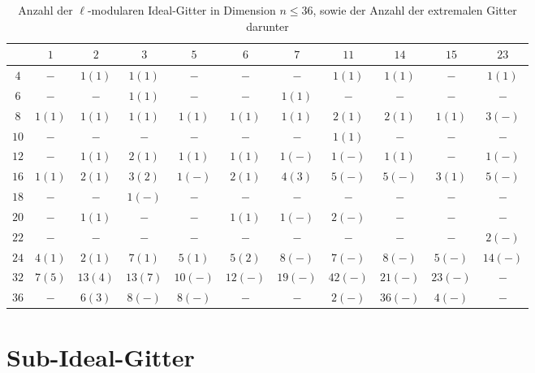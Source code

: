 \documentclass[12pt,a4paper,halfparskip,headsepline,bibtotocnumbered]{scrreprt}
\theoremstyle{nummermitklammern}
\theoremstyle{nonumberbreak}
\begin{document}
\begin{table}\label{tab:numidlat}
	\centering
	\begin{tabular}{|c||c|c|c|c|c|c|c|c|c|c|}
		\hline
		\backslashbox{$n$}{$\ell$}	&$1$	&$2$	&$3$	&$5$	&$6$	&$7$	&$11$	&$14$	&$15$	&$23$\\ \hline \hline
		$4$		&$-$		&$1(1)$		&$1(1)$		&$-$		&$-$		&$-$		&$1(1)$		&$1(1)$		&$-$		&$1(1)$ \\ \hline
		$6$		&$-$		&$-$		&$1(1)$		&$-$		&$-$		&$1(1)$		&$-$		&$-$		&$-$		&$-$ \\ \hline
		$8$		&$1(1)$		&$1(1)$		&$1(1)$		&$1(1)$		&$1(1)$		&$1(1)$		&$2(1)$		&$2(1)$		&$1(1)$		&$3(-)$ \\ \hline
		$10$	&$-$		&$-$		&$-$		&$-$		&$-$		&$-$		&$1(1)$		&$-$		&$-$		&$-$ \\ \hline
		$12$	&$-$		&$1(1)$		&$2(1)$		&$1(1)$		&$1(1)$		&$1(-)$		&$1(-)$		&$1(1)$		&$-$		&$1(-)$ \\ \hline
		$16$	&$1(1)$		&$2(1)$		&$3(2)$		&$1(-)$		&$2(1)$		&$4(3)$		&$5(-)$		&$5(-)$		&$3(1)$		&$5(-)$ \\ \hline
		$18$	&$-$		&$-$		&$1(-)$		&$-$		&$-$		&$-$		&$-$		&$-$		&$-$		&$-$ \\ \hline
		$20$	&$-$		&$1(1)$		&$-$		&$-$		&$1(1)$		&$1(-)$		&$2(-)$		&$-$		&$-$		&$-$ \\ \hline
		$22$	&$-$		&$-$		&$-$		&$-$		&$-$		&$-$		&$-$		&$-$		&$-$		&$2(-)$ \\ \hline
		$24$	&$4(1)$		&$2(1)$		&$7(1)$		&$5(1)$		&$5(2)$		&$8(-)$		&$7(-)$		&$8(-)$		&$5(-)$		&$14(-)$ \\ \hline
		$32$	&$7(5)$		&$13(4)$	&$13(7)$	&$10(-)$	&$12(-)$	&$19(-)$	&$42(-)$	&$21(-)$	&$23(-)$	&$-$ \\ \hline
		$36$	&$-$		&$6(3)$		&$8(-)$		&$8(-)$		&$-$		&$-$		&$2(-)$		&$36(-)$	&$4(-)$		&$-$ \\ \hline
	\end{tabular}
	\caption{Anzahl der $\ell$-modularen Ideal-Gitter in Dimension $n \leq 36$, sowie der Anzahl der extremalen Gitter darunter}
\end{table}

\chapter{Sub-Ideal-Gitter}
\end{document}
